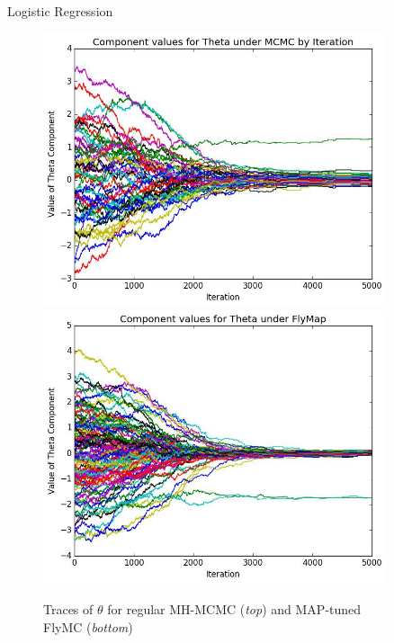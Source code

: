 \documentclass[final]{beamer}
\newlength{\sepwid}
\newlength{\onecolwid}
\newlength{\twocolwid}
\begin{document}
\begin{frame}[t]
\begin{columns}[t]
\begin{column}{\twocolwid}
\begin{columns}[t,totalwidth=\twocolwid]
\begin{column}{\onecolwid}
\begin{block}{Logistic Regression}
\begin{figure}
  \begin{center}
    \includegraphics[width=0.5\linewidth]{Figures/trace_mcmc.png}
    \includegraphics[width=0.5\linewidth]{Figures/trace_flymap.png}
  \end{center}
  \caption{Traces of $\theta$ for regular MH-MCMC (\emph{top}) and MAP-tuned
  FlyMC (\emph{bottom})}
  \label{fig:traces}
\end{figure}

\end{block}

\end{column} %

\end{columns} %

\end{column} %

\begin{column}{\sepwid}\end{column} %

\begin{column}{\onecolwid} %


\end{column}
\end{columns}
\end{frame}
\end{document}
